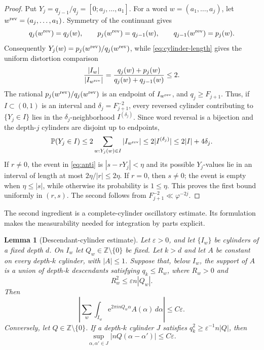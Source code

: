 \documentclass[11pt,a4paper]{amsart}
\newtheorem{lemma}[theorem]{Lemma}
\theoremstyle{definition}
\theoremstyle{remark}
\newcommand{\Z}{\mathbb Z}
\newcommand{\Pp}{\mathbb P}
\newcommand{\e}{\mathrm e}
\begin{document}
\begin{proof}
Put $Y_j=q_{j-1}/q_j=[0;a_j,\ldots,a_1]$.  For a word
$w=(a_1,\ldots,a_j)$, let $w^{\rm rev}=(a_j,\ldots,a_1)$.  Symmetry of the
continuant gives
\[
 q_j(w^{\rm rev})=q_j(w),
 \qquad p_j(w^{\rm rev})=q_{j-1}(w),
 \qquad q_{j-1}(w^{\rm rev})=p_j(w).
\]
Consequently $Y_j(w)=p_j(w^{\rm rev})/q_j(w^{\rm rev})$, while
\eqref{eq:cylinder-length} gives the uniform distortion comparison
\[
 \frac{|I_w|}{|I_{w^{\rm rev}}|}
 =\frac{q_j(w)+p_j(w)}{q_j(w)+q_{j-1}(w)}\le2.
\]
The rational $p_j(w^{\rm rev})/q_j(w^{\rm rev})$ is an endpoint of
$I_{w^{\rm rev}}$, and $q_j\ge F_{j+1}$.  Thus, if $I\subset(0,1)$ is an
interval and $\delta_j=F_{j+1}^{-2}$, every reversed cylinder contributing to
$\{Y_j\in I\}$ lies in the $\delta_j$-neighborhood $I^{(\delta_j)}$.  Since
word reversal is a bijection and the depth-$j$ cylinders are disjoint up to
endpoints,
\[
 \Pp(Y_j\in I)
 \le2\sum_{w:Y_j(w)\in I}|I_{w^{\rm rev}}|
 \le2|I^{(\delta_j)}|
 \le2|I|+4\delta_j.
\]
If $r\ne0$, the event in \eqref{eq:anti} is $|s-rY_j|<\eta$ and its possible
$Y_j$-values lie in an interval of length at most $2\eta/|r|\le2\eta$.
If $r=0$, then $s\ne0$; the event is empty when $\eta\le|s|$, while otherwise
its probability is $1\le\eta$.  This proves the first bound uniformly in
$(r,s)$.  The second follows from $F_{j+1}^{-2}\ll\varphi^{-2j}$.
\end{proof}

The second ingredient is a complete-cylinder oscillatory estimate.  Its
formulation makes the measurability needed for integration by parts explicit.

\begin{lemma}[Descendant-cylinder estimate]\label{lem:descendant}
Let $\varepsilon>0$, and let $\{I_w\}$ be cylinders of a fixed depth $d$.
On $I_w$ let
$Q_w\in\Z\setminus\{0\}$ be fixed.  Let $k>d$ and let $A$ be constant on every
depth-$k$ cylinder, with $|A|\le1$.  Suppose that, below $I_w$, the support of
$A$ is a union of depth-$k$ descendants satisfying $q_k\le R_w$, where
$R_w>0$ and
\[
 R_w^2\le\varepsilon n|Q_w|.
\]
Then
\begin{equation}\label{eq:descendant}
 \left|\sum_w\int_{I_w}
       \e^{2\pi i nQ_w\alpha}A(\alpha)\,d\alpha\right|
 \le C\varepsilon.
\end{equation}
Conversely, let $Q\in\Z\setminus\{0\}$.  If a depth-$k$ cylinder $J$
satisfies $q_k^2\ge\varepsilon^{-1}n|Q|$, then
\begin{equation}\label{eq:phase-freeze}
 \sup_{\alpha,\alpha'\in J}|nQ(\alpha-\alpha')|
 \le C\varepsilon.
\end{equation}
\end{lemma}
\end{document}

